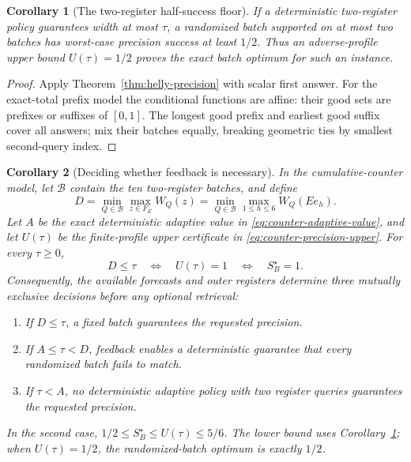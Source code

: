 \documentclass[12pt]{article}
\newtheorem{corollary}{Corollary}
\begin{document}
\begin{corollary}[The two-register half-success floor]
\label{prop:counter-half-floor}
If a deterministic two-register policy guarantees width at most $\tau$,
a randomized batch supported on at most two batches has worst-case
precision success at least $1/2$. Thus an adverse-profile upper bound
$U(\tau)=1/2$ proves the exact batch optimum for such an instance.
\end{corollary}
\begin{proof}
Apply Theorem~\ref{thm:helly-precision} with scalar first answer.
For the exact-total prefix model the conditional functions are affine:
their good sets are prefixes or suffixes of $[0,1]$. The longest good
prefix and earliest good suffix cover all answers; mix their batches
equally, breaking geometric ties by smallest second-query index.
\end{proof}
\begin{corollary}[Deciding whether feedback is necessary]
\label{cor:counter-feedback-triage}
In the cumulative-counter model, let $\mathcal B$ contain the ten
two-register batches, and define
\[
 D=\min_{Q\in\mathcal B}\max_{z\in F_E}W_Q(z)
   =\min_{Q\in\mathcal B}\max_{1\leq h\leq6}W_Q(Ee_h).
\]
Let $A$ be the exact deterministic adaptive value in
\eqref{eq:counter-adaptive-value}, and let $U(\tau)$ be the
finite-profile upper certificate in \eqref{eq:counter-precision-upper}.
For every $\tau\geq0$,
\[
 D\leq\tau
 \quad\Longleftrightarrow\quad U(\tau)=1
 \quad\Longleftrightarrow\quad S_B^\star=1.
\]
Consequently, the available forecasts and outer registers determine
three mutually exclusive decisions before any optional retrieval:
\begin{enumerate}
\item If $D\leq\tau$, a fixed batch guarantees the requested precision.
\item If $A\leq\tau<D$, feedback enables a deterministic guarantee that
      every randomized batch fails to match.
\item If $\tau<A$, no deterministic adaptive policy with two register
      queries guarantees the requested precision.
\end{enumerate}
In the second case,
$1/2\leq S_B^\star\leq U(\tau)\leq5/6$.
The lower bound uses Corollary~\ref{prop:counter-half-floor}; when
$U(\tau)=1/2$, the randomized-batch optimum is exactly $1/2$.
\end{corollary}
\end{document}
